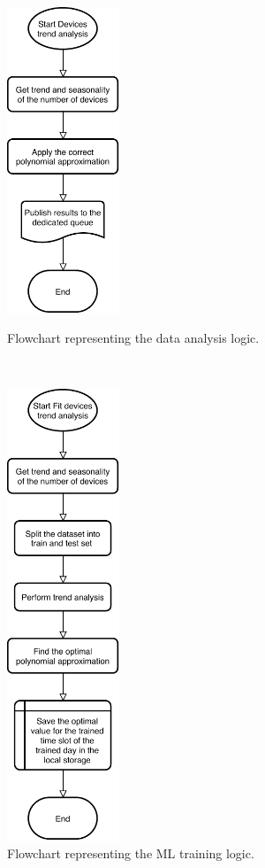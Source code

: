 \begin{figure}
\begin{minipage}[b]{8.5cm}
\centering
\includegraphics[width=0.3\textwidth]{images/flowML}
\caption{Flowchart representing the data analysis logic.}
\label{fig:flowML}
\end{minipage}
\ \hspace{2mm} \hspace{3mm} \
\begin{minipage}[b]{8.5cm}
\centering
\includegraphics[width=0.3\textwidth]{images/flowtrainML}
\caption{Flowchart representing the ML training logic.}
\label{fig:flowtrainML}
\end{minipage}
\end{figure}

